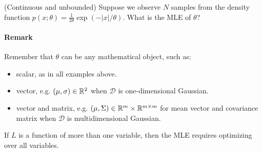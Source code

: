 \documentclass{discussion}
\begin{document}
\vspace{.5em}

\begin{exercise}(Continuous and unbounded)
Suppose we observe $N$ samples from the density function $p(x;\theta) = \frac{1}{2\theta} \exp(-|x| / \theta).$ What is the MLE of $\theta$?
\end{exercise}

\paragraph{Remark} Remember that $\theta$ can be any mathematical object, such as:
\begin{itemize}
\item scalar, as in all examples above.
\item vector, e.g. $(\mu,\sigma) \in \mathbb{R}^2$ when $\mathcal{D}$ is one-dimensional Gaussian.
\item vector and matrix, e.g. $(\mu, \Sigma) \in \mathbb{R}^m \times \mathbb{R}^{m \times m}$ for mean vector and covariance matrix when $\mathcal{D}$ is multidimensional Gaussian.
\end{itemize}
If $L$ is a function of more than one variable, then the MLE requires optimizing over all variables.



\end{document}
